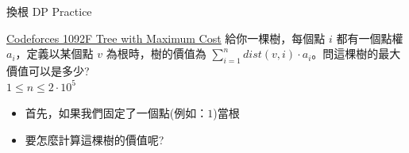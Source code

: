 \documentclass[aspectratio=169]{beamer}
\begin{document}
    \begin{frame}{換根 DP Practice}
        \begin{block}{\href{https://codeforces.com/contest/1092/problem/F}{Codeforces 1092F Tree with Maximum Cost}}
        給你一棵樹，每個點 $i$ 都有一個點權 $a_i$，定義以某個點 $v$ 為根時，樹的價值為 $\sum_{i=1}^n dist(v,i) \cdot a_i$。問這棵樹的最大價值可以是多少? \\
        \vspace{5mm}
        $1 \le n \le 2 \cdot 10^5$
        \end{block}
        \begin{itemize}
            \item<2-> 首先，如果我們固定了一個點(例如：$1$)當根
            \item<2-> 要怎麼計算這棵樹的價值呢?
        \end{itemize}
    \end{frame}
    
\end{document}

